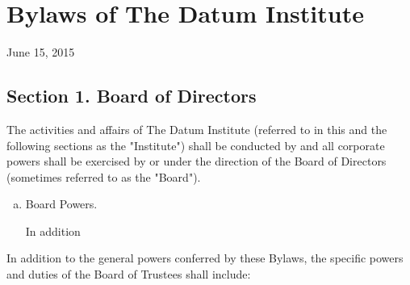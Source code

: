 \section{Bylaws of The Datum Institute}

June 15, 2015

\subsection{Section 1. Board of Directors}

The activities and affairs of The Datum Institute (referred to in this and the following sections as the "Institute") shall be conducted by and all corporate powers shall be exercised by or under the direction of the Board of Directors (sometimes referred to as the "Board"). 

\begin{enumerate}[(a)]
\item Board Powers. 

In addition 

\end{enumerate}

In addition to the general powers conferred by these Bylaws, the specific powers and duties of the Board of Trustees shall include:

